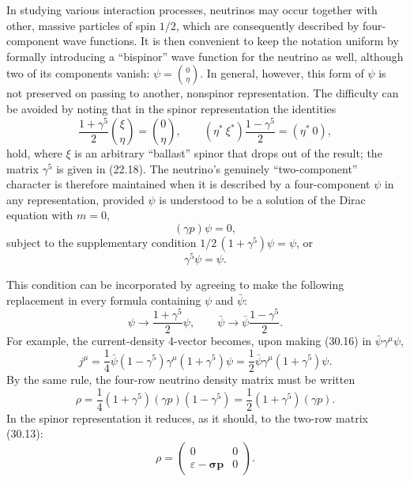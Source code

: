 In studying various interaction processes, neutrinos may occur together with other, massive particles of spin $1/2$, which are consequently described by four-component wave functions. It is then convenient to keep the notation uniform by formally introducing a ``bispinor'' wave function for the neutrino as well, although two of its components vanish: $\psi=\binom{0}{\eta}$. In general, however, this form of $\psi$ is not preserved on passing to another, nonspinor representation. The difficulty can be avoided by noting that in the spinor representation the identities
\[
\frac{1+\gamma^5}{2}\binom{\xi}{\eta}=\binom{0}{\eta},
\qquad
(\eta^*\ \xi^*)\frac{1-\gamma^5}{2}=(\eta^*\ 0),
\]
hold, where $\xi$ is an arbitrary ``ballast'' spinor that drops out of the result; the matrix $\gamma^5$ is given in (22.18). The neutrino's genuinely ``two-component'' character is therefore maintained when it is described by a four-component $\psi$ in any representation, provided $\psi$ is understood to be a solution of the Dirac equation with $m=0$,
\begin{equation}
(\gamma p)\psi=0,
\tag{30.14}
\end{equation}
subject to the supplementary condition $1/2\,(1+\gamma^5)\psi=\psi$, or
\begin{equation}
\gamma^5\psi=\psi.
\tag{30.15}
\end{equation}

This condition can be incorporated by agreeing to make the following replacement in every formula containing $\psi$ and $\bar\psi$:
\begin{equation}
\psi\to\frac{1+\gamma^5}{2}\psi,
\qquad
\bar\psi\to\bar\psi\frac{1-\gamma^5}{2}.
\tag{30.16}
\end{equation}
For example, the current-density 4-vector becomes, upon making (30.16) in $\bar\psi\gamma^\mu\psi$,
\begin{equation}
j^\mu=\frac14\bar\psi(1-\gamma^5)\gamma^\mu(1+\gamma^5)\psi
=\frac12\bar\psi\gamma^\mu(1+\gamma^5)\psi.
\tag{30.17}
\end{equation}
By the same rule, the four-row neutrino density matrix must be written
\begin{equation}
\rho=\frac14(1+\gamma^5)(\gamma p)(1-\gamma^5)
=\frac12(1+\gamma^5)(\gamma p).
\tag{30.18}
\end{equation}
In the spinor representation it reduces, as it should, to the two-row matrix (30.13):
\[
\rho=\begin{pmatrix}0&0\\ \varepsilon-\boldsymbol\sigma\mathbf p&0\end{pmatrix}.
\]

